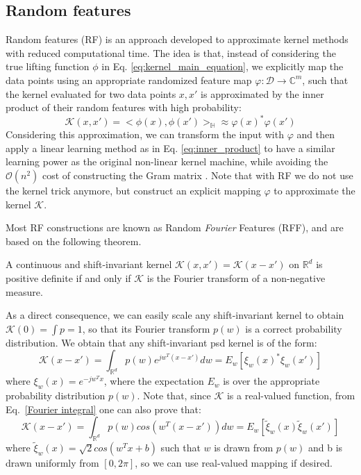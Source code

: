 \subsection{Random features}
Random features (RF) \citep{rahimi2008random} is an approach developed to approximate kernel methods with reduced computational time. The idea is that, instead of considering the true lifting function $\phi$ in Eq. \ref{eq:kernel_main_equation}, we explicitly map the data points using an appropriate randomized feature map $\varphi:\mathcal{D} \xrightarrow{}\mathbb{C}^m$, such that the kernel evaluated for two data points $x, x'$ is approximated by the inner product of their random features with high probability:
\begin{equation}
\label{eq:approx_RF}
\mathcal{K}(x,x')=<\phi(x),\phi(x')>_\mathbb{H} \approx \varphi(x)^*\varphi(x')
\end{equation}
Considering this approximation, we can transform the input with $\varphi$ and then apply a linear learning method as in Eq. \ref{eq:inner_product} to have a similar learning power as the original non-linear kernel machine, while avoiding the $\mathcal{O}(n^2)$ cost of constructing the Gram matrix . Note that with RF we do not use the kernel trick anymore, but construct an explicit mapping $\varphi$ to approximate the kernel $\mathcal{K}$.

Most RF constructions are known as Random \emph{Fourier} Features (RFF), and are based on the following theorem.
\begin{theorem}
A continuous and shift-invariant kernel $\mathcal{K}(x,x')=\mathcal{K}(x-x')$ on $\mathbb{R}^d$ is positive definite if and only if $\mathcal{K}$ is the Fourier transform of a non-negative measure.
\end{theorem}
As a direct consequence, we can easily scale any shift-invariant kernel to obtain $\mathcal{K}(0) = \int p = 1$, so that its Fourier transform $p(w)$ is a correct probability distribution. We obtain that any shift-invariant psd kernel is of the form:
\begin{equation}
\label{Fourier integral}
\mathcal{K}(x-x')=\int_{\mathbb{R}^d}p(w)e^{jw^T(x-x')}dw= E_w[\xi_w(x)^*\xi_w(x')]
\end{equation}
where $\xi_w(x)=e^{-jw^Tx}$, where the expectation $E_w$ is over the appropriate probability distribution $p(w)$. Note that, since $\mathcal{K}$ is a real-valued function, from Eq.~\ref{Fourier integral} one can also prove that:
\begin{equation}
\label{real Fourier integral}
\mathcal{K}(x-x')=\int_{\mathbb{R}^d}p(w)cos({w^T(x-x')})dw=E_w[\tilde \xi_w(x)\tilde \xi_w(x')]
\end{equation}
where $\tilde \xi_w(x)=\sqrt{2}cos(w^Tx+b)$ such that $w$ is drawn from $p(w)$ and b is drawn uniformly from $[0,2\pi]$, so we can use real-valued mapping if desired.

